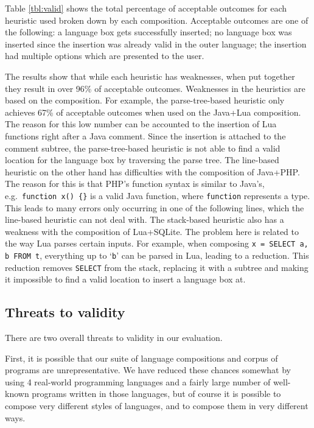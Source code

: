 \documentclass[sigplan,screen]{acmart}\settopmatter{printfolios=true,printccs=false,printacmref=false}
\begin{document}
Table \ref{tbl:valid} shows the total percentage of
acceptable outcomes for each heuristic used broken down by each composition.
Acceptable outcomes are one of the following: a language box gets successfully
inserted; no language box was inserted since the insertion was already valid in
the outer language; the insertion had multiple options which are presented to
the user.

The results show that while each heuristic has weaknesses, when put together
they result in over 96\% of acceptable outcomes. Weaknesses in the heuristics
are based on the composition. For example, the parse-tree-based heuristic only
achieves 67\% of acceptable outcomes when used on the Java+Lua composition. The
reason for this low number can be accounted to the insertion of Lua functions
right after a Java comment.  Since the insertion is attached to the comment
subtree, the parse-tree-based heuristic is not able to find a valid location for
the language box by traversing the parse tree.  The line-based heuristic on the
other hand has difficulties with the composition of Java+PHP. The reason for
this is that PHP's function syntax is similar to Java's, e.g.~\texttt{function
x() \{\}} is a valid Java function, where \texttt{function} represents a type.
This leads to many errors only occurring in one of the following lines, which
the line-based heuristic can not deal with. The stack-based heuristic also has
a weakness with the composition of Lua+SQLite. The problem here is related to
the way Lua parses certain inputs. For example, when composing \texttt{x =
SELECT a, b FROM t}, everything up to `\texttt{b}' can be parsed in Lua,
leading to a reduction. This reduction removes \texttt{SELECT} from the stack,
replacing it with a subtree and making it impossible to find a valid location
to insert a language box at.


\subsection{Threats to validity}

There are two overall threats to validity in our evaluation.

First, it is possible that our suite of language compositions and corpus of
programs are unrepresentative. We have reduced these chances somewhat by using
4 real-world programming languages and a fairly large number of well-known
programs written in those languages, but of course it is possible to compose
very different styles of languages, and to compose them in very different ways.
\end{document}
